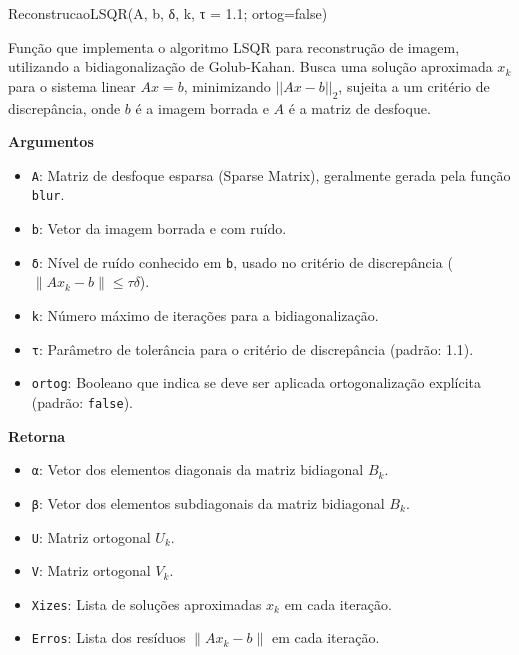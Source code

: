 \documentclass[11pt]{article}
\providecommand{\tightlist}{%
      \setlength{\itemsep}{0pt}\setlength{\parskip}{0pt}}
\newenvironment{Shaded}{}{}
\newcommand{\FloatTok}[1]{\textcolor[rgb]{0.25,0.63,0.44}{{#1}}}
\newcommand{\FunctionTok}[1]{\textcolor[rgb]{0.02,0.16,0.49}{{#1}}}
\newcommand{\NormalTok}[1]{{#1}}
\newcommand{\ConstantTok}[1]{\textcolor[rgb]{0.53,0.00,0.00}{{#1}}}
\newcommand{\OperatorTok}[1]{\textcolor[rgb]{0.40,0.40,0.40}{{#1}}}
\begin{document}
    \begin{Shaded}
\begin{Highlighting}[]
\FunctionTok{ReconstrucaoLSQR}\NormalTok{(A, b, δ, k, τ }\OperatorTok{=} \FloatTok{1.1}\NormalTok{; ortog}\OperatorTok{=}\ConstantTok{false}\NormalTok{)}
\end{Highlighting}
\end{Shaded}

Função que implementa o algoritmo LSQR para reconstrução de imagem,
utilizando a bidiagonalização de Golub-Kahan. Busca uma solução
aproximada \(x_k\) para o sistema linear \(Ax = b\), minimizando
\(||Ax - b||_2\), sujeita a um critério de discrepância, onde \(b\) é a
imagem borrada e \(A\) é a matriz de desfoque.

\textbf{Argumentos}

\begin{itemize}
\tightlist
\item
  \texttt{A}: Matriz de desfoque esparsa (Sparse Matrix), geralmente
  gerada pela função \texttt{blur}.
\item
  \texttt{b}: Vetor da imagem borrada e com ruído.
\item
  \texttt{δ}: Nível de ruído conhecido em \texttt{b}, usado no critério
  de discrepância (\(\|Ax_k - b\| \le \tau\delta\)).
\item
  \texttt{k}: Número máximo de iterações para a bidiagonalização.
\item
  \texttt{τ}: Parâmetro de tolerância para o critério de discrepância
  (padrão: 1.1).
\item
  \texttt{ortog}: Booleano que indica se deve ser aplicada
  ortogonalização explícita (padrão: \texttt{false}).
\end{itemize}

\textbf{Retorna}

\begin{itemize}
\tightlist
\item
  \texttt{α}: Vetor dos elementos diagonais da matriz bidiagonal
  \(B_k\).
\item
  \texttt{β}: Vetor dos elementos subdiagonais da matriz bidiagonal
  \(B_k\).
\item
  \texttt{U}: Matriz ortogonal \(U_k\).
\item
  \texttt{V}: Matriz ortogonal \(V_k\).
\item
  \texttt{Xizes}: Lista de soluções aproximadas \(x_k\) em cada
  iteração.
\item
  \texttt{Erros}: Lista dos resíduos \(\|Ax_k - b\|\) em cada iteração.
\end{itemize}
\end{document}
